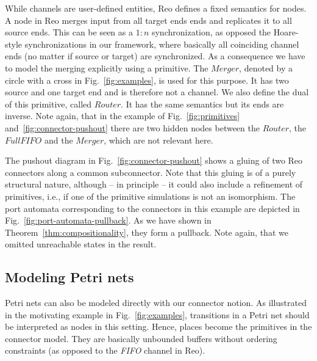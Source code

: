 \documentclass[copyright,creativecommons]{eptcs}
\begin{document}
While channels are user-defined
entities, Reo defines a fixed semantics for nodes.
A node in Reo merges input from all target ends
ends and replicates it to all source ends. This
can be seen as a $1:n$ synchronization, 
as opposed the Hoare-style synchronizations
in our framework, where basically all
coinciding channel ends (no matter if source or target) 
are synchronized.
As a consequence we have to model the merging 
explicitly using a primitive. The $Merger$,
denoted by a circle with a cross in Fig.~\ref{fig:examples},
is used for this purpose. It has two source and one target end
and is therefore not a channel. We also define the dual
of this primitive, called $Router$. It has the same semantics
but its ends are inverse. Note again, that in the example
of Fig.~\ref{fig:primitives} and~\ref{fig:connector-pushout}
there are two hidden nodes between the $Router$, the $FullFIFO$
and the $Merger$, which are not relevant here.

The pushout diagram in Fig.~\ref{fig:connector-pushout} shows
a gluing of two Reo connectors along a common subconnector.
Note that this gluing is of a purely structural nature, 
although -- in principle -- it could also include a refinement of
primitives, i.e., if one of the primitive simulations is not 
an isomorphism. The port automata corresponding to the 
connectors in this example are depicted in
Fig.~\ref{fig:port-automata-pullback}. As we have shown 
in Theorem~\ref{thm:compositionality}, they form a pullback.
Note again, that we omitted unreachable states in the result.


\subsection{Modeling Petri nets}

Petri nets can also be modeled directly with our connector notion. As illustrated in the
motivating example in Fig.~\ref{fig:examples}, transitions in a Petri net
should be interpreted as nodes in this setting. Hence, places
become the primitives in the connector model. They are basically unbounded buffers
without ordering constraints (as opposed to the \emph{FIFO} channel in Reo). 
\end{document}
